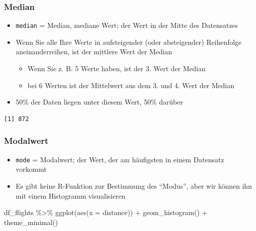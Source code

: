 \documentclass[
  letterpaper,
  DIV=11]{scrartcl}
\newenvironment{Shaded}{\begin{snugshade}}{\end{snugshade}}
\newcommand{\AttributeTok}[1]{\textcolor[rgb]{0.40,0.45,0.13}{#1}}
\newcommand{\FunctionTok}[1]{\textcolor[rgb]{0.28,0.35,0.67}{#1}}
\newcommand{\NormalTok}[1]{\textcolor[rgb]{0.00,0.23,0.31}{#1}}
\newcommand{\SpecialCharTok}[1]{\textcolor[rgb]{0.37,0.37,0.37}{#1}}
\providecommand{\tightlist}{%
  \setlength{\itemsep}{0pt}\setlength{\parskip}{0pt}}\usepackage{longtable,booktabs,array}
\begin{document}
\hypertarget{median}{%
\subsubsection{Median}\label{median}}

\begin{itemize}
\tightlist
\item
  \texttt{median} = Median, mediane Wert; der Wert in der Mitte des
  Datensatzes
\item
  Wenn Sie alle Ihre Werte in aufsteigender (oder absteigender)
  Reihenfolge aneinanderreihen, ist der mittlere Wert der Median

  \begin{itemize}
  \tightlist
  \item
    Wenn Sie z. B. 5 Werte haben, ist der 3. Wert der Median
  \item
    bei 6 Werten ist der Mittelwert aus dem 3. und 4. Wert der Median
  \end{itemize}
\item
  50\% der Daten liegen unter diesem Wert, 50\% darüber
\end{itemize}

\begin{Shaded}
\end{Shaded}

\begin{verbatim}
[1] 872
\end{verbatim}

\hypertarget{modalwert}{%
\subsubsection{Modalwert}\label{modalwert}}

\begin{itemize}
\tightlist
\item
  \texttt{mode} = Modalwert; der Wert, der am häufigsten in einem
  Datensatz vorkommt
\item
  Es gibt keine R-Funktion zur Bestimmung des ``Modus'', aber wir können
  ihn mit einem Histogramm visualisieren
\end{itemize}

\begin{Shaded}
\begin{Highlighting}[]
\NormalTok{df\_flights }\SpecialCharTok{\%\textgreater{}\%} 
  \FunctionTok{ggplot}\NormalTok{(}\FunctionTok{aes}\NormalTok{(}\AttributeTok{x =}\NormalTok{ distance)) }\SpecialCharTok{+}
  \FunctionTok{geom\_histogram}\NormalTok{() }\SpecialCharTok{+}
  \FunctionTok{theme\_minimal}\NormalTok{() }
\end{Highlighting}
\end{Shaded}
\end{document}
